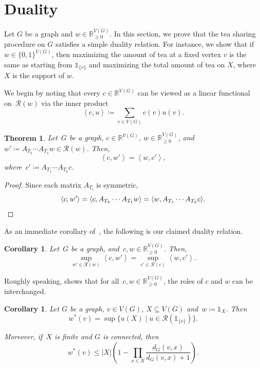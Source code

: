 \documentclass[reqno, 12pt]{amsart}
\numberwithin{equation}{section}
\numberwithin{figure}{section}
\theoremstyle{plain}
\newtheorem{theorem}[thm]{Theorem}
\newtheorem{corollary}[thm]{Corollary}
\theoremstyle{definition}
\newcommand*{\abs}[1]{\ensuremath{{\left\lvert {#1} \right\rvert}}}
\newcommand*{\gen}[1]{\ensuremath{{\left\langle {#1} \right\rangle}}}
\newcommand*{\weights}{\ensuremath{\mathbb{R}_{\geq 0}^{V(G)}}}
\begin{document}
\section{Duality}
\label{sec:duality}
 Let $G$ be a graph and ${w \in \mathbb{R}_{\geq 0}^{V(G)}}$.
In this section, we prove that the tea sharing procedure on $G$ satisfies a simple duality relation. For instance, we show that if $w \in \{0,1\}^{V(G)}$, then maximizing the amount of tea at a fixed vertex $v$ is the same as starting from $\mathds{1}_{\{v\}}$ and maximizing the total amount of tea on $X$, where $X$ is the support of $w$. 

 We begin by noting that every ${c \in \mathbb{R}^{V(G)}}$ can be viewed as a linear functional on~$\mathcal{R}(w)$ via the inner product 
\[
    \gen{c,u} \coloneqq \sum_{v\in V(G)} c(v)u(v).
\]

\begin{theorem} \label{thm:duality}
    Let~$G$ be a graph, ${c \in \mathbb{R}^{V(G)}}$, ${w \in \weights}$, and~${w' \coloneqq A_{T_k} \cdots A_{T_1}w \in \mathcal{R}(w)}$. 
    Then,
    \[
        \gen{c,w'} = \gen{w,c'},
    \]
    where~${c' \coloneqq A_{T_1} \cdots A_{T_k} c}$.
\end{theorem}


\begin{proof}
    Since each matrix $A_{T_i}$ is symmetric, 
    \[
       \gen{c,w'} 
       = \gen{c, A_{T_k} \cdots A_{T_1}w} 
       = \gen{w, A_{T_1} \cdots A_{T_k}c}. 
       \qedhere
    \]
\end{proof}

As an immediate corollary of~, the following is our claimed duality relation. 

\begin{corollary} \label{cor:switch}
    Let~$G$ be a graph, and~${c,w \in \weights}$. 
    Then, 
    \[
        \sup_{w' \in \mathcal{R}(w)} \gen{c,w'} 
        = \sup_{c' \in \mathcal{R}(c)} \gen {w,c'}.
    \]
\end{corollary}

Roughly speaking,  shows that for all~${c,w \in \weights}$, the roles of $c$ and $w$ can be interchanged.  


\begin{corollary}
        Let $G$ be a graph, $v \in V(G)$, $X \subseteq V(G)$ and~${w  \coloneqq \mathds{1}_X}$. 
    Then
    \[
        w^*(v) 
        = \sup\{u(X) \mid u \in \mathcal{R}(\mathds{1}_{\{v\}})\}.
    \] 
    
    Moreover, if~$X$ is finite and $G$ is connected, then
    \[
        w^*(v) \leq \abs{X} \left( 1 - \prod_{x \in X} \frac{d_G(v,x)}{d_G(v,x)+1} \right).
    \]
\end{corollary}
\end{document}
